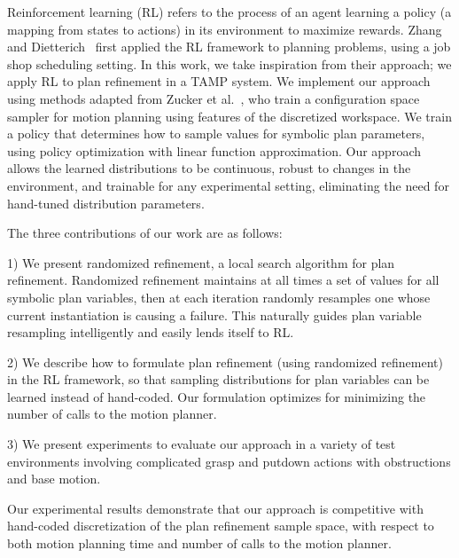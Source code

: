 Reinforcement learning (RL) refers to the process of an agent learning a policy (a mapping from states to actions)
in its environment to maximize rewards. Zhang and Dietterich~\cite{JobShopSched} first applied the RL framework
to planning problems, using a job shop scheduling setting. In this work, we take inspiration from
their approach; we apply RL to plan refinement in a TAMP system. We implement our approach using methods adapted from
Zucker et al.~\cite{workspacebias}, who train a configuration space sampler for motion planning
using features of the discretized workspace. We train a policy that
determines how to sample values for symbolic plan parameters, using policy optimization with linear function
approximation. Our approach allows the learned distributions to be continuous, robust to changes in
the environment, and trainable for any experimental setting, eliminating the need for hand-tuned
distribution parameters.

The three contributions of our work are as follows:
\begin{tightlist}
\item[1)] We present randomized refinement,
a local search algorithm for plan refinement. Randomized refinement maintains at
all times a set of values for all symbolic plan variables, then at each iteration randomly
resamples one whose current instantiation is causing a failure. This naturally guides
plan variable resampling intelligently and easily lends itself to RL.
\item[2)] We describe how to formulate plan refinement (using randomized
refinement) in the RL framework, so that sampling
distributions for plan variables can be learned instead of hand-coded. Our formulation optimizes for
minimizing the number of calls to the motion planner.
\item[3)] We present experiments to evaluate our approach
in a variety of test environments involving complicated grasp and putdown
actions with obstructions and base motion.
\end{tightlist}
Our experimental results demonstrate that our approach is competitive with hand-coded discretization
of the plan refinement sample space, with respect to both motion planning time and number of calls
to the motion planner.